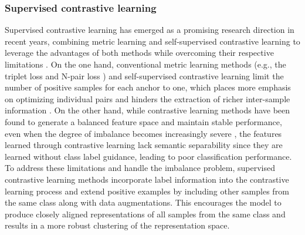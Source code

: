 \subsubsection{Supervised contrastive learning}

Supervised contrastive learning has emerged as a promising research direction in recent years, combining metric learning and self-supervised contrastive learning to leverage the advantages of both methods while overcoming their respective limitations \cite{khosla2020supervised}. 
On the one hand, conventional metric learning methods (e.g., the triplet loss \cite{weinberger2009distance} and N-pair loss \cite{sohn2016improved}) and self-supervised contrastive learning \cite{tian2020contrastive} limit the number of positive samples for each anchor to one, which places more emphasis on optimizing individual pairs and hinders the extraction of richer inter-sample information \cite{khosla2020supervised}. 
On the other hand, while contrastive learning methods have been found to generate a balanced feature space and maintain stable performance, even when the degree of imbalance becomes increasingly severe \cite{yang2020rethinking, kang2021exploring}, the features learned through contrastive learning lack semantic separability since they are learned without class label guidance, leading to poor classification performance. 
To address these limitations and handle the imbalance problem, supervised contrastive learning methods incorporate label information into the contrastive learning process and extend positive examples by including other samples from the same class along with data augmentations. This encourages the model to produce closely aligned representations of all samples from the same class and results in a more robust clustering of the representation space. 

